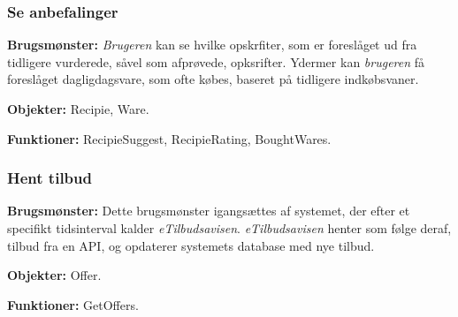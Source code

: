 \subsubsection*{Se anbefalinger}
\textbf{Brugsmønster:} \textit{Brugeren} kan se hvilke opskrfiter, som er foreslåget ud fra tidligere vurderede, såvel som afprøvede, opksrifter.
Ydermer kan \textit{brugeren} få foreslåget dagligdagsvare, som ofte købes, baseret på tidligere indkøbsvaner.

\textbf{Objekter:} Recipie, Ware.

\textbf{Funktioner:} RecipieSuggest, RecipieRating, BoughtWares.

\subsubsection*{Hent tilbud}
\textbf{Brugsmønster:} Dette brugsmønster igangsættes af systemet, der efter et specifikt tidsinterval kalder \textit{eTilbudsavisen}.
\textit{eTilbudsavisen} henter som følge deraf, tilbud fra en API, og opdaterer systemets database med nye tilbud.

\textbf{Objekter:} Offer.

\textbf{Funktioner:} GetOffers.